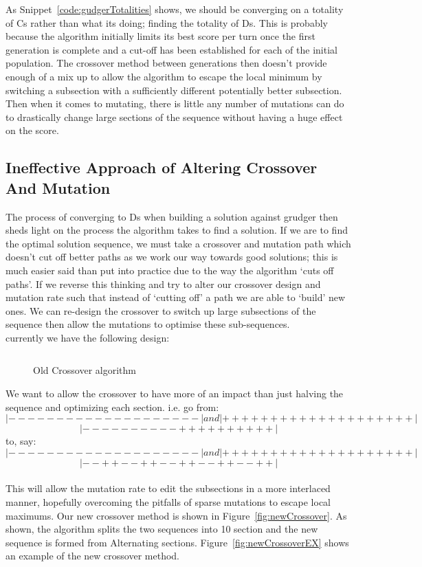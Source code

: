 As Snippet~\ref{code:gudgerTotalities} shows, we should be converging on a totality of Cs rather than what its doing;
finding the totality of Ds.
This is probably because the algorithm initially limits its best score per turn once the first generation is complete and a cut-off has been established for each of the initial population.
The crossover method between generations then doesn't provide enough of a mix up to allow the algorithm to escape the local minimum by switching a subsection with a sufficiently different potentially better subsection.
Then when it comes to mutating, there is little any number of mutations can do to drastically change large sections of the sequence without having a huge effect on the score.\\

\subsection{Ineffective Approach of Altering Crossover And Mutation}\label{subsec:ineffectiveApproachOfAlteringCrossoverAndMutation}
The process of converging to Ds when building a solution against grudger then sheds light on the process the algorithm takes to find a solution.
If we are to find the optimal solution sequence, we must take a crossover and mutation path which doesn't cut off better paths as we work our way towards good solutions;
this is much easier said than put into practice due to the way the algorithm `cuts off paths'.
If we reverse this thinking and try to alter our crossover design and mutation rate such that instead of `cutting off' a path we are able to `build' new ones.
We can re-design the crossover to switch up large subsections of the sequence then allow the mutations to optimise these sub-sequences.\\

currently we have the following design:

\begin{figure}
    \inputminted{python}{code_snippets/oldCrossover.py}
    \caption{Old Crossover algorithm}\label{fig:oldCrossover}
\end{figure}

We want to allow the crossover to have more of an impact than just halving the sequence and optimizing each section. i.e. go from:\\
\[|--------------------| and |++++++++++++++++++++|\]
\[|----------++++++++++|\]
to, say:\\
\[|--------------------| and |++++++++++++++++++++|\]
\[ |--++--++--++--++--++|\]\\
This will allow the mutation rate to edit the subsections in a more interlaced manner, hopefully overcoming the pitfalls of sparse mutations to escape local maximums.
Our new crossover method is shown in Figure~\ref{fig:newCrossover}.
As shown, the algorithm splits the two sequences into 10 section and the new sequence is formed from Alternating sections.
Figure~\ref{fig:newCrossoverEX} shows an example of the new crossover method.\\

